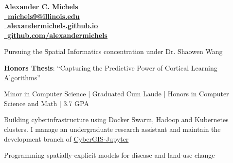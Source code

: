 \documentclass{acmresume}
\begin{document}
	\begin{multicols}{2}
		\vspace*{.15cm}
		\textbf{\Huge Alexander C. Michels} \\
		\columnbreak
        \hfill\href{mailto:alexandercm4297@gmail.com}{\textbf{\faEnvelope~michels9@illinois.edu}} \\
		\hfill\href{http://alexandermichels.github.io}{\faGlobeAmericas~\textbf{alexandermichels.github.io}} \\
		\hfill\href{https://github.com/alexandermichels}{\faGithub~\textbf{github.com/alexandermichels}}
	\end{multicols}


		\begin{titemize}
			\item{Pursuing the Spatial Informatics concentration under Dr. Shaowen Wang}
		\end{titemize}

		\begin{titemize}
            \item \textbf{Honors Thesis}: ``Capturing the Predictive Power of Cortical Learning Algorithms''
			\item{Minor in Computer Science | Graduated Cum Laude | Honors in Computer Science and Math | 3.7 GPA}
		\end{titemize}

	\vspace{.25cm}

        \begin{titemize}
            \item Building cyberinfrastructure using Docker Swarm, Hadoop and Kubernetes clusters. I manage an undergraduate research assistant and maintain the development branch of \href{https://cybergis.illinois.edu/project/cybergis-jupyter/}{CyberGIS-Jupyter}
            \item Programming spatially-explicit models for disease and land-use change
        \end{titemize}
\end{document}

